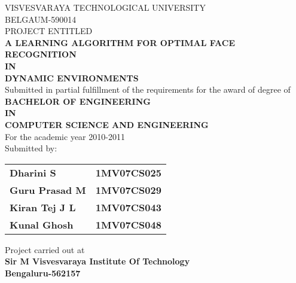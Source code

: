 \newcommand{\tab}{\hspace*{8.5 cm}}

%

\begin{center}


VISVESVARAYA TECHNOLOGICAL UNIVERSITY \\ BELGAUM-590014 \\
\vspace{5mm}
PROJECT ENTITLED\\
\vspace{5mm}
\textbf{A LEARNING ALGORITHM FOR OPTIMAL FACE RECOGNITION \\ IN \\ DYNAMIC ENVIRONMENTS}\\
\vspace{5mm}
Submitted in partial fulfillment of the requirements for the award of degree of \\
\vspace{5mm}
\textbf{BACHELOR OF ENGINEERING}\\
\textbf{IN}\\
\textbf{COMPUTER SCIENCE AND ENGINEERING}\\
\vspace{5mm}
For the academic year 2010-2011\\
\vspace{5mm}
Submitted by:
\vspace{5mm}
\\
\begin{table}[h]
\begin{tabular}{lr}
\textbf{Dharini S} \tab & \textbf{1MV07CS025}   \\
\textbf{Guru Prasad M} \tab & \textbf{1MV07CS029}   \\
\textbf{Kiran Tej J L}  \tab & \textbf{1MV07CS043}  \\
\textbf{Kunal Ghosh} \tab &  \textbf{1MV07CS048}   \\ 
\end{tabular}
\end{table}
\vspace{5mm}
Project carried out at \\
\vspace{5mm}
\textbf{Sir M Visvesvaraya Institute Of Technology}\\
\vspace{5mm}
\textbf{Bengaluru-562157}\\
\vspace{5mm}

\end{center}
